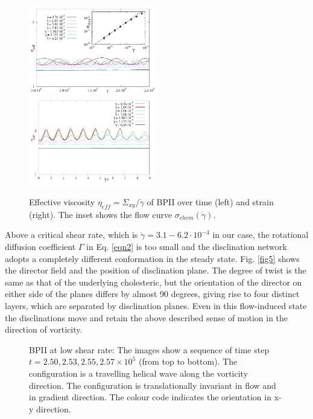 \documentclass[aps,pre,onecolumn,groupedaddress]{revtex4-1}
\newcommand{\e}[1]{\times10^{#1}}
\begin{document}
\begin{figure}[h]
\includegraphics[width=0.495\textwidth]{stress_bp2.pdf}
\includegraphics[width=0.495\textwidth]{stress_vs_strain_bp2.pdf}
\caption{Effective viscosity $\eta_{eff}=\Sigma_{xy}/\dot{\gamma}$ of BPII over time (left) and strain (right). The inset shows the flow curve $\sigma_{chem}(\dot{\gamma})$.}
\label{bp2-rheo}
\end{figure}

Above a critical shear rate, which is $\dot{\gamma}=3.1-6.2\cdot 10^{-4}$ in our case, the rotational diffusion coefficient $\Gamma$ in Eq. \ref{eqn2} is too small and the disclination network adopts a completely different conformation in the steady state.
Fig. \ref{fig5} shows the director field and the position of disclination plane.
The degree of twist is the same as that of the underlying cholesteric, but the orientation of the director on either side of the planes differs by almost 90 degrees, giving rise to four distinct layers, which are separated by disclination planes.
Even in this flow-induced state the disclinations move and retain the above described sense of motion in the direction of vorticity.

\begin{figure}[h]
\caption{BPII at low shear rate: The images show a sequence of time step $t=2.50, 2.53,2.55, 2.57\e{5}$ (from top to bottom). The configuration is a travelling helical wave along the vorticity direction. The configuration is translationally invariant in flow and in gradient direction. The colour code indicates the orientation in x-y direction.}
\label{bp2-low}
\end{figure}
\end{document}
